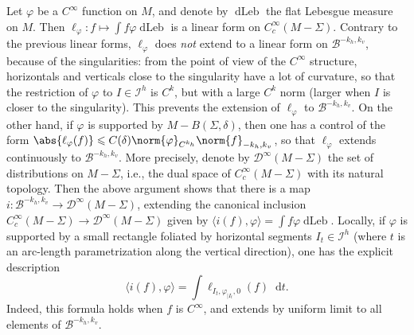 \documentclass[11pt, a4paper, oneside, final, pagebackref]{amsart}
\newcommand{\boI}{\mathcal{I}}
\newcommand{\boB}{\mathcal{B}}
\newcommand{\boD}{\mathcal{D}}
\newcommand{\dd}{\mathop{}\!\mathrm{d}}
\newcommand{\restr}{|}
\DeclareMathOperator{\dLeb}{dLeb}
\renewcommand{\phi}{\varphi}
\renewcommand{\leq}{\leqslant}
\theoremstyle{definition}
\numberwithin{equation}{section}
\begin{document}
Let $\phi$ be a $C^\infty$ function on $M$, and denote by $\dLeb$ the flat
Lebesgue measure on $M$. Then $\ell_\phi : f \mapsto  \int f \phi \dLeb$ is a
linear form on $C^\infty_c(M-\Sigma)$. Contrary to the previous linear forms,
$\ell_\phi$ does \emph{not} extend to a linear form on $\boB^{-k_h, k_v}$,
because of the singularities: from the point of view of the $C^\infty$
structure, horizontals and verticals close to the singularity have a lot of
curvature, so that the restriction of $\phi$ to $I \in \boI^h$ is $C^k$, but
with a large $C^k$ norm (larger when $I$ is closer to the singularity).
This prevents the extension of $\ell_\phi$ to $\boB^{-k_h, k_v}$. On the
other hand, if $\phi$ is supported by $M-B(\Sigma, \delta)$, then one has a
control of the form $\abs{\ell_\phi(f)} \leq C(\delta)
\norm{\phi}_{C^{k_h}}\norm{f}_{-k_h, k_v}$, so that $\ell_\phi$ extends
continuously to $\boB^{-k_h, k_v}$. More precisely, denote by
$\boD^\infty(M-\Sigma)$ the set of distributions on $M-\Sigma$, i.e., the
dual space of $C^\infty_c(M-\Sigma)$ with its natural topology. Then the
above argument shows that there is a map $i : \boB^{-k_h, k_v} \to
\boD^\infty(M-\Sigma)$, extending the canonical inclusion
$C^\infty_c(M-\Sigma) \to \boD^\infty(M-\Sigma)$ given by $\langle i(f), \phi
\rangle = \int f \phi \dLeb$. Locally, if $\phi$ is supported by a small
rectangle foliated by horizontal segments $I_t \in \boI^h$ (where $t$ is an
arc-length parametrization along the vertical direction), one has the
explicit description
\begin{equation}
\label{eq:decrit_if}
  \langle i(f), \phi \rangle = \int \ell_{I_t, \phi_{\restr I_t}, 0}(f) \dd t.
\end{equation}
Indeed, this formula holds when $f$ is $C^\infty$, and extends by uniform
limit to all elements of $\boB^{-k_h, k_v}$.
\end{document}
